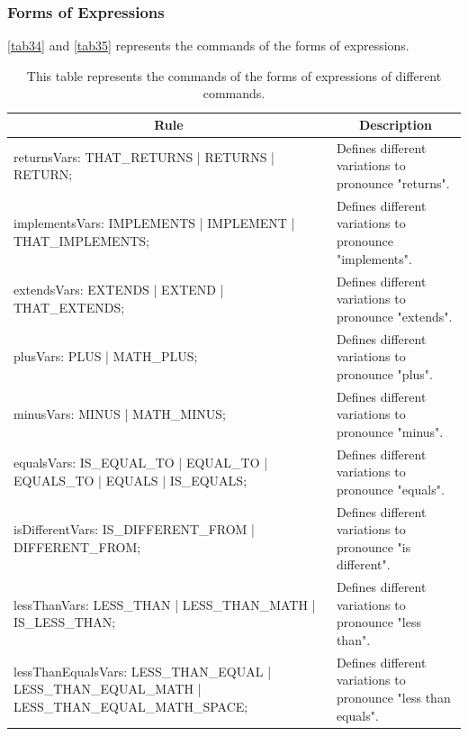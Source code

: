 \subsubsection{Forms of Expressions}
\autoref{tab34} and \autoref{tab35} represents the commands of the forms of expressions.

\begin{table}[H]
	\centering
	\begin{tabular}{|p{8cm}|p{7cm}|}
		\hline
		\multicolumn{1}{|c|}{{\bf Rule}} & \multicolumn{1}{c|}{{\bf Description}} \\ \hline
		returnsVars: THAT\_RETURNS | RETURNS | RETURN; & Defines different variations to pronounce "returns". \\ \hline
		implementsVars: IMPLEMENTS | IMPLEMENT | THAT\_IMPLEMENTS; & Defines different variations to pronounce "implements". \\ \hline
		extendsVars: EXTENDS | EXTEND | THAT\_EXTENDS; & Defines different variations to pronounce "extends". \\ \hline
		plusVars: PLUS | MATH\_PLUS; & Defines different variations to pronounce "plus". \\ \hline
		minusVars: MINUS | MATH\_MINUS; & Defines different variations to pronounce "minus". \\ \hline
		equalsVars: IS\_EQUAL\_TO | EQUAL\_TO | EQUALS\_TO | EQUALS | IS\_EQUALS; & Defines different variations to pronounce "equals". \\ \hline
		isDifferentVars: IS\_DIFFERENT\_FROM | DIFFERENT\_FROM; & Defines different variations to pronounce "is different". \\ \hline
		lessThanVars: LESS\_THAN | LESS\_THAN\_MATH | IS\_LESS\_THAN; & Defines different variations to pronounce "less than". \\ \hline
		lessThanEqualsVars: LESS\_THAN\_EQUAL | LESS\_THAN\_EQUAL\_MATH | LESS\_THAN\_EQUAL\_MATH\_SPACE; & Defines different variations to pronounce "less than equals". \\ \hline
	\end{tabular}
	\caption{This table represents the commands of the forms of expressions of different commands.}
	\label{tab34}
\end{table}

